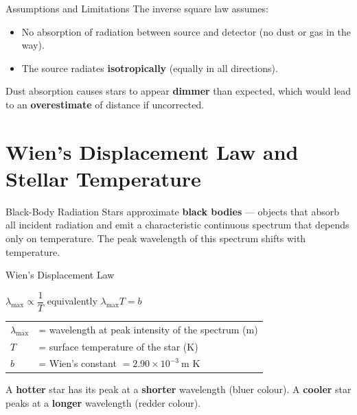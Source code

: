\begin{warningbox}{Assumptions and Limitations}
The inverse square law assumes:
\begin{itemize}[itemsep=2pt]
  \item No absorption of radiation between source and detector (no dust or gas in the way).
  \item The source radiates \textbf{isotropically} (equally in all directions).
\end{itemize}
Dust absorption causes stars to appear \textbf{dimmer} than expected, which would lead to an \textbf{overestimate} of distance if uncorrected.
\end{warningbox}

\section{Wien's Displacement Law and Stellar Temperature}

\begin{definitionbox}{Black-Body Radiation}
Stars approximate \textbf{black bodies} — objects that absorb all incident radiation and emit a characteristic continuous spectrum that depends only on temperature. The peak wavelength of this spectrum shifts with temperature.
\end{definitionbox}

\begin{formulabox}{Wien's Displacement Law}
\begin{center}
\Large $\lambda_{\max} \propto \dfrac{1}{T}$ \qquad equivalently \qquad $\lambda_{\max} T = b$
\end{center}
\vspace{0.3em}
\begin{tabular}{@{}ll@{}}
$\lambda_{\max}$ & = wavelength at peak intensity of the spectrum (m) \\
$T$ & = surface temperature of the star (K) \\
$b$ & = Wien's constant $= 2.90\times10^{-3}\ \text{m K}$ \\
\end{tabular}
\vspace{0.4em}

A \textbf{hotter} star has its peak at a \textbf{shorter} wavelength (bluer colour). A \textbf{cooler} star peaks at a \textbf{longer} wavelength (redder colour).
\end{formulabox}




